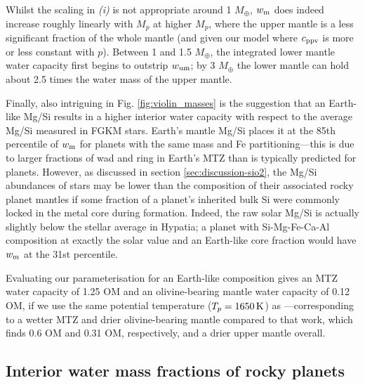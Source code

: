 \documentclass[fleqn,usenatbib]{mnras}
\begin{document}
Whilst the scaling in \textit{(i)} is not appropriate around 1 $M_\oplus$, $w_{\rm m}$ does indeed increase roughly linearly with $M_p$ at higher $M_p$, where the upper mantle is a less significant fraction of the whole mantle (and given our model where $c_{\rm ppv}$ is more or less constant with $p$). Between 1 and 1.5 $M_\oplus$, the integrated lower mantle water capacity first begins to outstrip $w_{\rm um}$; by 3 $M_\oplus$ the lower mantle can hold about 2.5 times the water mass of the upper mantle. 


Finally, also intriguing in Fig. \ref{fig:violin_masses} is the suggestion that an Earth-like Mg/Si results in a higher interior water capacity with respect to the average Mg/Si measured in FGKM stars. Earth's mantle Mg/Si places it at the 85th percentile of $w_{\rm m}$ for planets with the same mass and Fe partitioning---this is due to larger fractions of wad and ring in Earth's MTZ than is typically predicted for planets. However, as discussed in section \ref{sec:discussion-sio2}, the Mg/Si abundances of stars may be lower than the composition of their associated rocky planet mantles if some fraction of a planet's inherited bulk Si were commonly locked in the metal core during formation. Indeed, the raw solar Mg/Si is actually slightly below the stellar average in Hypatia; a planet with Si-Mg-Fe-Ca-Al composition at exactly the solar value and an Earth-like core fraction would have $w_{\rm m}$ at the 31st percentile.




Evaluating our parameterisation for an Earth-like composition gives an MTZ water capacity of 1.25 OM and an olivine-bearing mantle water capacity of 0.12 OM, if we use the same potential temperature ($T_p = 1650\,{\rm K}$) as \citet{andrault_mantle_2022}---corresponding to a wetter MTZ and drier olivine-bearing mantle compared to that work, which finds 0.6 OM and 0.31 OM, respectively, and a drier upper mantle overall.



\subsection{Interior water mass fractions of rocky planets}
\end{document}
